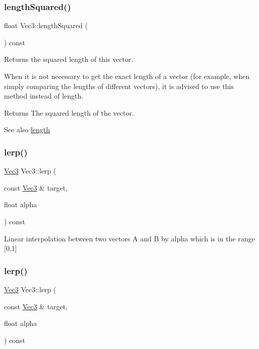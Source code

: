 \subsubsection{\texorpdfstring{length\+Squared()}{lengthSquared()}\hspace{0.1cm}{\footnotesize\ttfamily [2/2]}}
{\footnotesize\ttfamily float Vec3\+::length\+Squared (\begin{DoxyParamCaption}{ }\end{DoxyParamCaption}) const\hspace{0.3cm}{\ttfamily [inline]}}

Returns the squared length of this vector.

When it is not necessary to get the exact length of a vector (for example, when simply comparing the lengths of different vectors), it is advised to use this method instead of length.

\begin{DoxyReturn}{Returns}
The squared length of the vector.
\end{DoxyReturn}
\begin{DoxySeeAlso}{See also}
\hyperlink{classVec3_a54be9143adb871a478ea3de19ca23f3b}{length} 
\end{DoxySeeAlso}
\mbox{\label{classVec3_a1e1f3d58cfbb3083f263000500f76a57}} 
\subsubsection{\texorpdfstring{lerp()}{lerp()}\hspace{0.1cm}{\footnotesize\ttfamily [1/2]}}
{\footnotesize\ttfamily \hyperlink{classVec3}{Vec3} Vec3\+::lerp (\begin{DoxyParamCaption}\item[{const \hyperlink{classVec3}{Vec3} \&}]{target,  }\item[{float}]{alpha }\end{DoxyParamCaption}) const\hspace{0.3cm}{\ttfamily [inline]}}

Linear interpolation between two vectors A and B by alpha which is in the range \mbox{[}0,1\mbox{]} \mbox{\label{classVec3_a1e1f3d58cfbb3083f263000500f76a57}} 
\subsubsection{\texorpdfstring{lerp()}{lerp()}\hspace{0.1cm}{\footnotesize\ttfamily [2/2]}}
{\footnotesize\ttfamily \hyperlink{classVec3}{Vec3} Vec3\+::lerp (\begin{DoxyParamCaption}\item[{const \hyperlink{classVec3}{Vec3} \&}]{target,  }\item[{float}]{alpha }\end{DoxyParamCaption}) const\hspace{0.3cm}{\ttfamily [inline]}}

